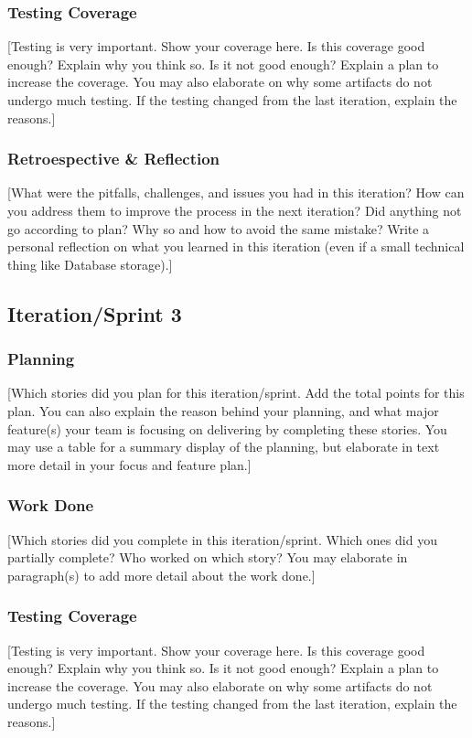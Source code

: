 \documentclass{article}
\begin{document}
\subsubsection{Testing Coverage}
[Testing is very important. Show your coverage here. Is this coverage good enough? Explain why you think so. Is it not good enough? Explain a plan to increase the coverage. You may also elaborate on why some artifacts do not undergo much testing. If the testing changed from the last iteration, explain the reasons.]

\subsubsection{Retroespective \& Reflection}
[What were the pitfalls, challenges, and issues you had in this iteration? How can you address them to improve the process in the next iteration? Did anything not go according to plan? Why so and how to avoid the same mistake? Write a personal reflection on what you learned in this iteration (even if a small technical thing like Database storage).]

\subsection{Iteration/Sprint 3}
\subsubsection{Planning}
[Which stories did you plan for this iteration/sprint. Add the total points for this plan. You can also explain the reason behind your planning, and what major feature(s) your team is focusing on delivering by completing these stories. You may use a table for a summary display of the planning, but elaborate in text more detail in your focus and feature plan.]

\subsubsection{Work Done}
[Which stories did you complete in this iteration/sprint. Which ones did you partially complete? Who worked on which story? You may elaborate in paragraph(s) to add more detail about the work done.]

\subsubsection{Testing Coverage}
[Testing is very important. Show your coverage here. Is this coverage good enough? Explain why you think so. Is it not good enough? Explain a plan to increase the coverage. You may also elaborate on why some artifacts do not undergo much testing. If the testing changed from the last iteration, explain the reasons.]
\end{document}
